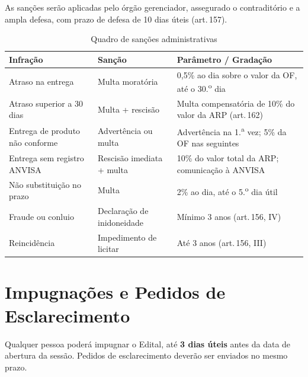 \documentclass[12pt,a4paper]{article}
\newcommand{\art}[1]{art.\,#1}
\begin{document}
\begin{legalbox}
\small
As sanções serão aplicadas pelo órgão gerenciador, assegurado o contraditório e
a ampla defesa, com prazo de defesa de 10 dias úteis (\art{157}).
\end{legalbox}

\begin{table}[H]\centering
\caption{Quadro de sanções administrativas}
\small{}
\begin{tabular}{L{5.0cm} C{2.0cm} L{6.5cm}}
  \color{white}\textbf{Infração} &
  \color{white}\textbf{Sanção} &
  \color{white}\textbf{Parâmetro / Gradação} \\
  \toprule
  Atraso na entrega &
    Multa moratória &
    0,5\% ao dia sobre o valor da OF, até o 30.\textsuperscript{o} dia \\
  Atraso superior a 30 dias &
    Multa + rescisão &
    Multa compensatória de 10\% do valor da ARP (\art{162}) \\
  Entrega de produto não conforme &
    Advertência ou multa &
    Advertência na 1.\textsuperscript{a} vez; 5\% da OF nas seguintes \\
  Entrega sem registro ANVISA &
    Rescisão imediata + multa &
    10\% do valor total da ARP; comunicação à ANVISA \\
  Não substituição no prazo &
    Multa &
    2\% ao dia, até o 5.\textsuperscript{o} dia útil \\
  Fraude ou conluio &
    Declaração de inidoneidade &
    Mínimo 3 anos (\art{156}, IV) \\
  Reincidência &
    Impedimento de licitar &
    Até 3 anos (\art{156}, III) \\
  \bottomrule
\end{tabular}
\end{table}

\section{Impugnações e Pedidos de Esclarecimento}

\begin{legalbox}[\art{164}, Lei n.\textsuperscript{o} 14.133/2021]
\small
Qualquer pessoa poderá impugnar o Edital, até \textbf{3 dias úteis} antes da
data de abertura da sessão. Pedidos de esclarecimento deverão ser enviados no
mesmo prazo.
\end{legalbox}
\end{document}

